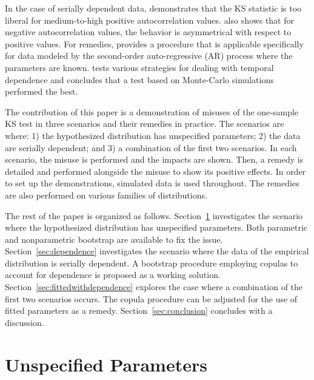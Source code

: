 \documentclass[12pt, letterpaper, titlepage]{article}
\begin{document}
In the case of serially dependent data, \citet{Durilleul} demonstrates that the 
KS statistic is too liberal for medium-to-high positive autocorrelation values. 
\citet{Durilleul} also shows that for negative autocorrelation values, the 
behavior is asymmetrical with respect to positive values. For remedies, 
\citet{Weiss} provides a procedure that is applicable specifically for data 
modeled by the second-order auto-regressive (AR) process where the parameters 
are known. \citet{Lanzante} tests various strategies for dealing with temporal 
dependence and concludes that a test based on Monte-Carlo simulations performed 
the best. %

The contribution of this paper is a demonstration of misuses of the one-sample
KS test in three scenarios and their remedies in practice. The scenarios are 
where:
1) the hypothesized distribution has unspecified parameters;
2) the data are serially dependent; and
3) a combination of the first two scenarios. 
In each scenario, the misuse is performed and the impacts are shown. Then, a
remedy is detailed and performed alongside the misuse to show its positive 
effects. In order to set up the demonstrations, simulated data is used 
throughout. The remedies are also performed on various families of 
distributions.

The rest of the paper is organized as follows. Section~\ref{sec:fitted}
investigates the scenario where the hypothesized distribution has unspecified
parameters. Both parametric and nonparametric bootstrap are available to fix the
issue. Section~\ref{sec:dependence} investigates the scenario where the data of 
the empirical distribution is serially dependent. A bootstrap procedure 
employing copulas to account for dependence is proposed as a working solution. 
Section~\ref{sec:fittedwithdependence}
explores the case where a combination of the first two scenarios occurs. The 
copula procedure can be adjusted for the use of fitted parameters as a remedy. 
Section~\ref{sec:conclusion} concludes with a discussion.

\section{Unspecified Parameters}
\label{sec:fitted}
\end{document}
